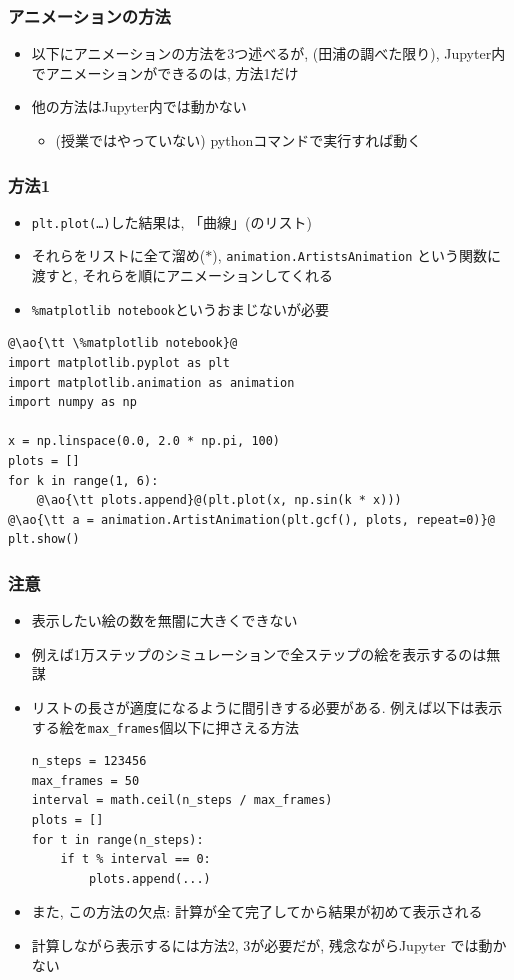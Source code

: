 \documentclass[10pt,dvipdfmx]{beamer}
\newcommand{\ao}[1]{{\color{blue}#1}}
\begin{document}
\begin{frame}[fragile]
  \frametitle{アニメーションの方法}
  \begin{itemize}
  \item 以下にアニメーションの方法を3つ述べるが,
    (田浦の調べた限り), Jupyter内でアニメーションができるのは,
    方法1だけ
  \item 他の方法はJupyter内では動かない
    \begin{itemize}
    \item (授業ではやっていない) pythonコマンドで実行すれば動く
    \end{itemize}
  \end{itemize}
\end{frame}

\begin{frame}[fragile]
  \frametitle{方法1}
  \begin{itemize}
  \item {\tt plt.plot(\ldots)}した結果は,
    「曲線」(のリスト)
  \item それらをリストに全て溜め($\ast$),
    {\tt animation.ArtistsAnimation}
    という関数に渡すと, それらを順にアニメーションしてくれる
  \item {\tt \%matplotlib notebook}というおまじないが必要
  \end{itemize}
\begin{center}
\begin{lstlisting}
@\ao{\tt \%matplotlib notebook}@
import matplotlib.pyplot as plt
import matplotlib.animation as animation
import numpy as np

x = np.linspace(0.0, 2.0 * np.pi, 100)
plots = []
for k in range(1, 6):
    @\ao{\tt plots.append}@(plt.plot(x, np.sin(k * x)))
@\ao{\tt a = animation.ArtistAnimation(plt.gcf(), plots, repeat=0)}@
plt.show()
\end{lstlisting}
\end{center}
\end{frame}

\begin{frame}[fragile]
  \frametitle{注意}
  \begin{itemize}
  \item 表示したい絵の数を無闇に大きくできない
  \item 例えば1万ステップのシミュレーションで全ステップの絵を表示するのは無謀
  \item リストの長さが適度になるように間引きする必要がある.
    例えば以下は表示する絵を{\tt max\_frames}個以下に押さえる方法
\begin{lstlisting}
n_steps = 123456
max_frames = 50
interval = math.ceil(n_steps / max_frames)
plots = []
for t in range(n_steps):
    if t % interval == 0:
        plots.append(...)
\end{lstlisting}
\item また, この方法の欠点: 計算が全て完了してから結果が初めて表示される
\item 計算しながら表示するには方法2, 3が必要だが, 残念ながらJupyter
  では動かない
\end{itemize}
\end{frame}
\end{document}
